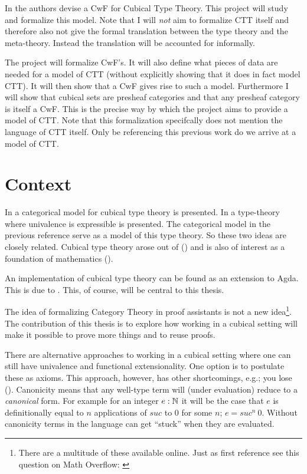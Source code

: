 In \cite{bezem-2014} the authors devise a CwF for Cubical Type Theory. This
project will study and formalize this model. Note that I will \emph{not} aim to
formalize CTT itself and therefore also not give the formal translation between
the type theory and the meta-theory. Instead the translation will be accounted
for informally.

The project will formalize CwF's. It will also define what pieces of data are
needed for a model of CTT (without explicitly showing that it does in fact model
CTT). It will then show that a CwF gives rise to such a model. Furthermore I
will show that cubical sets are presheaf categories and that any presheaf
category is itself a CwF. This is the precise way by which the project aims to
provide a model of CTT. Note that this formalization specifcally does not
mention the language of CTT itself. Only be referencing this previous work do we
arrive at a model of CTT.
%
\section{Context}
%
In \cite{bezem-2014} a categorical model for cubical type theory is presented.
In \cite{cohen-2016} a type-theory where univalence is expressible is presented.
The categorical model in the previous reference serve as a model of this type
theory. So these two ideas are closely related. Cubical type theory arose out of
 (\cite{hott-2013}) and is also of interest as a
foundation of mathematics (\cite{voevodsky-2011}).

An implementation of cubical type theory can be found as an extension to Agda.
This is due to \citeauthor{cubical-agda}. This, of course, will be central to
this thesis.

The idea of formalizing Category Theory in proof assistants is not a new
idea\footnote{There are a multitude of these available online. Just as first
reference see this question on Math Overflow: \cite{mo-formalizations}}. The
contribution of this thesis is to explore how working in a cubical setting will
make it possible to prove more things and to reuse proofs.

There are alternative approaches to working in a cubical setting where one can
still have univalence and functional extensionality. One option is to postulate
these as axioms. This approach, however, has other shortcomings, e.g.; you lose
 (\cite{huber-2016}). Canonicity means that any well-type
term will (under evaluation) reduce to a \emph{canonical} form. For example for
an integer $e : \mathbb{N}$ it will be the case that $e$ is definitionally equal to $n$
applications of $\mathit{suc}$ to $0$ for some $n$; $e = \mathit{suc}^n\ 0$.
Without canonicity terms in the language can get ``stuck'' when they are
evaluated.

